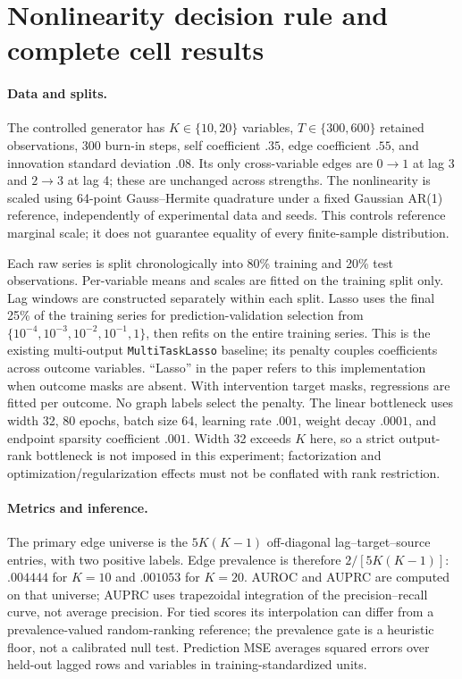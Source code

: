 \section{Nonlinearity decision rule and complete cell results}
\label{app:gates}

\paragraph{Data and splits.}
The controlled generator has $K\in\{10,20\}$ variables, $T\in\{300,600\}$
retained observations, 300 burn-in steps, self coefficient $.35$, edge
coefficient $.55$, and innovation standard deviation $.08$. Its only
cross-variable edges are $0\to1$ at lag 3 and $2\to3$ at lag 4; these are
unchanged across strengths. The nonlinearity is scaled using 64-point
Gauss--Hermite quadrature under a fixed Gaussian AR(1) reference, independently
of experimental data and seeds. This controls reference marginal scale;
it does not guarantee equality of every finite-sample distribution.

Each raw series is split chronologically into 80\% training and 20\% test
observations. Per-variable means and scales are fitted on the training split
only. Lag windows are constructed separately within each split. Lasso uses
the final 25\% of the training series for prediction-validation selection
from $\{10^{-4},10^{-3},10^{-2},10^{-1},1\}$, then refits on the entire
training series. This is the existing multi-output \texttt{MultiTaskLasso}
baseline; its penalty couples coefficients across outcome variables.
``Lasso'' in the paper refers to this implementation when outcome masks are
absent. With intervention target masks, regressions are fitted per outcome.
No graph labels select the penalty. The linear bottleneck uses width 32,
80 epochs, batch size 64, learning rate $.001$, weight decay $.0001$, and
endpoint sparsity coefficient $.001$. Width 32 exceeds $K$ here, so a strict
output-rank bottleneck is not imposed in this experiment; factorization and
optimization/regularization effects must not be conflated with rank restriction.

\paragraph{Metrics and inference.}
The primary edge universe is the $5K(K-1)$ off-diagonal lag--target--source
entries, with two positive labels. Edge prevalence is therefore
$2/[5K(K-1)]$: $.004444$ for $K=10$ and $.001053$ for $K=20$.
AUROC and AUPRC are computed on that universe; AUPRC uses trapezoidal
integration of the precision--recall curve, not average precision. For tied
scores its interpolation can differ from a prevalence-valued random-ranking
reference; the prevalence gate is a heuristic floor, not a calibrated null
test. Prediction MSE averages squared errors over held-out lagged rows and
variables in training-standardized units.

